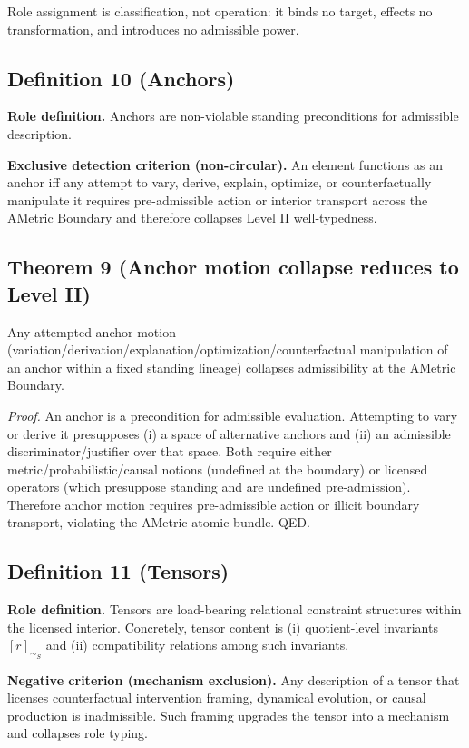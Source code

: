 \documentclass[12pt]{article}
\theoremstyle{plain}
\begin{document}
Role assignment is classification, not operation: it binds no target, effects no transformation, and introduces no admissible power.

\subsection{Definition 10 (Anchors)}

\textbf{Role definition.} Anchors are non-violable standing preconditions for admissible description.

\textbf{Exclusive detection criterion (non-circular).} An element functions as an anchor iff any attempt to vary, derive, explain, optimize, or counterfactually manipulate it requires pre-admissible action or interior transport across the AMetric Boundary and therefore collapses Level II well-typedness.

\subsection{Theorem 9 (Anchor motion collapse reduces to Level II)}

Any attempted anchor motion (variation/derivation/explanation/optimization/counterfactual manipulation of an anchor within a fixed standing lineage) collapses admissibility at the AMetric Boundary.

\textit{Proof.} An anchor is a precondition for admissible evaluation. Attempting to vary or derive it presupposes (i) a space of alternative anchors and (ii) an admissible discriminator/justifier over that space. Both require either metric/probabilistic/causal notions (undefined at the boundary) or licensed operators (which presuppose standing and are undefined pre-admission). Therefore anchor motion requires pre-admissible action or illicit boundary transport, violating the AMetric atomic bundle. QED.

\subsection{Definition 11 (Tensors)}

\textbf{Role definition.} Tensors are load-bearing relational constraint structures within the licensed interior. Concretely, tensor content is (i) quotient-level invariants $[r]_{\sim_S}$ and (ii) compatibility relations among such invariants.

\textbf{Negative criterion (mechanism exclusion).} Any description of a tensor that licenses counterfactual intervention framing, dynamical evolution, or causal production is inadmissible. Such framing upgrades the tensor into a mechanism and collapses role typing.
\end{document}
